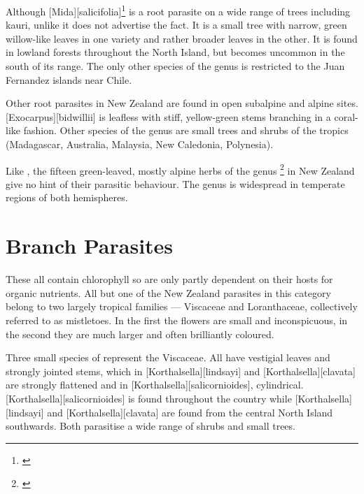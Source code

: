 Although [Mida][salicifolia]\footnote{\cite{philipson1959some}} is a root parasite on a wide range of trees including kauri, unlike  it does not advertise the fact.
It is a small tree with narrow, green willow-like leaves in one variety and rather broader leaves in the other.
It is found in lowland forests throughout the North Island, but becomes uncommon in the south of its range.
The only other species of the genus is restricted to the Juan Fernandez islands near Chile.

Other root parasites in New Zealand are found in open subalpine and alpine sites. [Exocarpus][bidwillii] is leafless with stiff, yellow-green stems branching in a coral-like fashion.
Other species of the genus are small trees and shrubs of the tropics (Madagascar, Australia, Malaysia, New Caledonia, Polynesia).

Like , the fifteen green-leaved, mostly alpine herbs of the genus \footnote{\cite{philipson1959some}} in New Zealand give no hint of their parasitic behaviour.
The genus is widespread in temperate regions of both hemispheres.

\section{Branch Parasites}

These all contain chlorophyll so are only partly dependent on their hosts for organic nutrients.
All but one of the New Zealand parasites in this category belong to two largely tropical families --- Viscaceae and Loranthaceae, collectively referred to as mistletoes.
In the first the flowers are small and inconspicuous, in the second they are much larger and often brilliantly coloured.

Three small species of  represent the Viscaceae.
All have vestigial leaves and strongly jointed stems, which in [Korthalsella][lindsayi] and [Korthalsella][clavata] are strongly flattened and in [Korthalsella][salicornioides], cylindrical. [Korthalsella][salicornioides] is found throughout the country while [Korthalsella][lindsayi] and [Korthalsella][clavata] are found from the central North Island southwards.
Both parasitise a wide range of shrubs and small trees.

